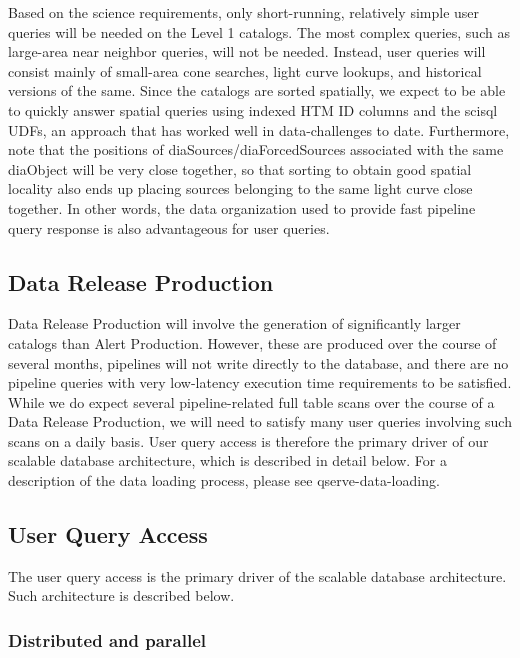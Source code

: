 \documentclass[DM,lsstdraft,toc]{lsstdoc}
\begin{document}
Based on the science requirements, only short-running, relatively simple
user queries will be needed on the Level 1 catalogs. The most complex
queries, such as large-area near neighbor queries, will not be needed.
Instead, user queries will consist mainly of small-area cone searches,
light curve lookups, and historical versions of the same. Since the
catalogs are sorted spatially, we expect to be able to quickly answer
spatial queries using indexed HTM ID columns and the scisql UDFs, an
approach that has worked well in data-challenges to date. Furthermore,
note that the positions of diaSources/diaForcedSources associated with
the same diaObject will be very close together, so that sorting to
obtain good spatial locality also ends up placing sources belonging to
the same light curve close together. In other words, the data
organization used to provide fast pipeline query response is also
advantageous for user queries.

\subsection{Data Release Production}\label{data-release-production}

Data Release Production will involve the generation of significantly
larger catalogs than Alert Production. However, these are produced over
the course of several months, pipelines will not write directly to the
database, and there are no pipeline queries with very low-latency
execution time requirements to be satisfied. While we do expect several
pipeline-related full table scans over the course of a Data Release
Production, we will need to satisfy many user queries involving such
scans on a daily basis. User query access is therefore the primary
driver of our scalable database architecture, which is described in
detail below. For a description of the data loading process, please see
qserve-data-loading.

\subsection{User Query Access}\label{user-query-access}

The user query access is the primary driver of the scalable database
architecture. Such architecture is described below.

\subsubsection{Distributed and parallel}\label{distributed-and-parallel}
\end{document}
